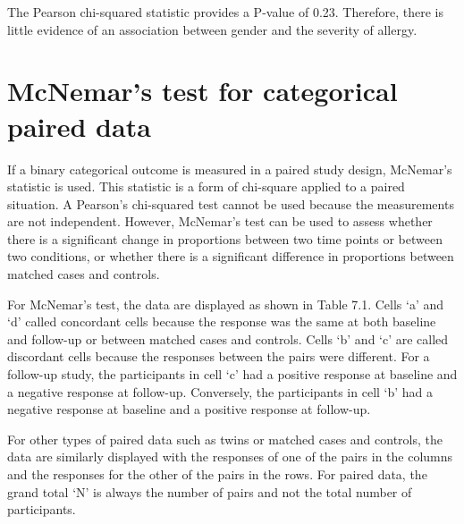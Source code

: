 \documentclass[
]{memoir}
\begin{document}
The Pearson chi-squared statistic provides a P-value of 0.23. Therefore, there is little evidence of an association between gender and the severity of allergy.

\hypertarget{mcnemars-test-for-categorical-paired-data}{%
\section{McNemar's test for categorical paired data}\label{mcnemars-test-for-categorical-paired-data}}

If a binary categorical outcome is measured in a paired study design, McNemar's statistic is used. This statistic is a form of chi-square applied to a paired situation. A Pearson's chi-squared test cannot be used because the measurements are not independent. However, McNemar's test can be used to assess whether there is a significant change in proportions between two time points or between two conditions, or whether there is a significant difference in proportions between matched cases and controls.

For McNemar's test, the data are displayed as shown in Table 7.1. Cells `a' and `d' called concordant cells because the response was the same at both baseline and follow-up or between matched cases and controls. Cells `b' and `c' are called discordant cells because the responses between the pairs were different. For a follow-up study, the participants in cell `c' had a positive response at baseline and a negative response at follow-up. Conversely, the participants in cell `b' had a negative response at baseline and a positive response at follow-up.

For other types of paired data such as twins or matched cases and controls, the data are similarly displayed with the responses of one of the pairs in the columns and the responses for the other of the pairs in the rows. For paired data, the grand total `N' is always the number of pairs and not the total number of participants.

 
  \providecommand{\huxb}[2]{\arrayrulecolor[RGB]{#1}\global\arrayrulewidth=#2pt}
  \providecommand{\huxvb}[2]{\color[RGB]{#1}\vrule width #2pt}
  \providecommand{\huxtpad}[1]{\rule{0pt}{#1}}
  \providecommand{\huxbpad}[1]{\rule[-#1]{0pt}{#1}}
\end{document}
